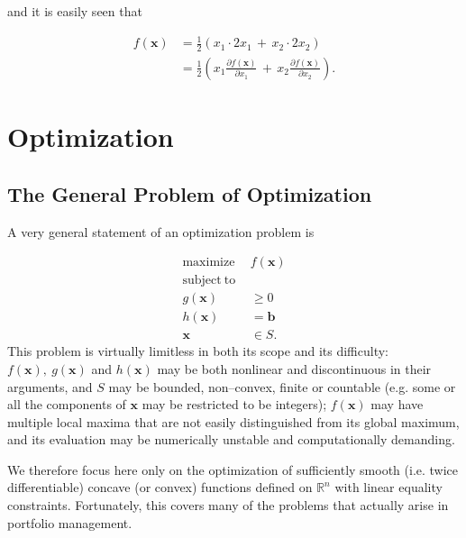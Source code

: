 \documentclass[graybox,envcountchap,sectrefs]{svmono}\usepackage[]{graphicx}\usepackage[]{xcolor}
\begin{document}
\begin{appendices}
and it is easily seen that

\begin{align}
f\left(\mathrm{\mathbf{x}}\right) & =\frac{1}{2}\left(x_{1}\cdotp2x_{1}\,+\,x_{2}\cdotp2x_{2}\right)\nonumber \\
 & =\frac{1}{2}\left(x_{1}\frac{\partial f\left(\mathrm{\mathbf{x}}\right)}{\partial x_{1}}\,+\,x_{2}\frac{\partial f\left(\mathrm{\mathbf{x}}\right)}{\partial x_{2}}\right).\label{eq:EulersTheorem3}
\end{align}


\section{Optimization}

\subsection{The General Problem of Optimization}

A very general statement of an optimization problem is

\begin{equation}
\begin{aligned}\mathrm{maximize}\ \  & f\left(\mathrm{\mathbf{x}}\right)\\
\mathrm{subject\ to}\\
g\left(\mathrm{\mathbf{x}}\right) & \geqslant0\\
h\left(\mathrm{\mathbf{x}}\right) & =\mathrm{\mathbf{b}}\\
\mathrm{\mathbf{x}} & \in S.
\end{aligned}
\label{eq:GeneralOptimizationProblem}
\end{equation}
This problem is virtually limitless in both its scope and its difficulty:
$f\left(\mathrm{\mathbf{x}}\right),\ g\left(\mathrm{\mathbf{x}}\right)$
and $h\left(\mathrm{\mathbf{x}}\right)$ may be both nonlinear and
discontinuous in their arguments, and $S$ may be bounded, non--convex,
finite or countable (e.g. some or all the components of $\mathrm{\mathbf{x}}$
may be restricted to be integers); $f\left(\mathrm{\mathbf{x}}\right)$
may have multiple local maxima that are not easily distinguished from
its global maximum, and its evaluation may be numerically unstable
and computationally demanding. 

We therefore focus here only on the optimization of sufficiently smooth
(i.e. twice differentiable) concave (or convex) functions defined
on $\mathbb{R}^{n}$ with linear equality constraints. Fortunately,
this covers many of the problems that actually arise in portfolio
management.


\end{appendices}
\end{document}
